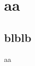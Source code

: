 \documentclass[../main.tex]{subfiles}
\begin{document}
\section{aa}
\secttoc
\subsection{blblb}

aa
\end{document}
